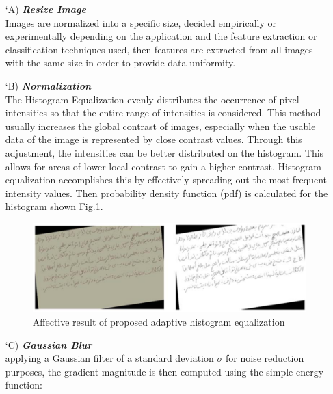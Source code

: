 \begin{itemize}[labelindent=1em,labelsep=0.25cm,leftmargin=*]
        \item[\char `A)] \textit{\textbf{Resize Image}}\\
        Images are normalized into a specific size, decided empirically or experimentally depending on the application and the feature extraction or classification techniques used, then features are extracted from all images  with the same size in order to provide data uniformity. 
        \item[\char `B)] \textit{\textbf{Normalization}}\\  
        The Histogram Equalization \cite{equalization} evenly distributes the occurrence of pixel intensities so that the entire range of intensities is considered. This method usually increases the global contrast of images, especially when the usable data of the image is represented by close contrast values. Through this adjustment, the intensities can be better distributed on the histogram. This allows for areas of lower local contrast to gain a higher contrast. Histogram equalization accomplishes this by effectively spreading out the most frequent intensity values. Then probability density function (pdf) is calculated for the histogram shown Fig.\ref{fig:equalize}.
        \begin{figure}[!htb]
            \centering
            \includegraphics[width=11cm]{images/equalize.png}
            \caption{Affective result of proposed adaptive histogram equalization}
            \label{fig:equalize}
        \end{figure}
        \item[\char `C)] \textit{\textbf{Gaussian Blur}}\\ 
        applying a Gaussian filter of a standard deviation   $\sigma$ for noise
        reduction purposes, the gradient magnitude is then computed using the
        simple energy function:
        

\end{itemize}
